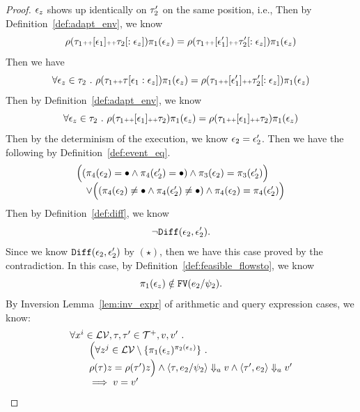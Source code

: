 \begin{proof}
$\mathtt{\epsilon}_z$ shows up identically on $\mathtt{\tau}_2'$ on the same position, i.e.,
Then by Definition~\ref{def:adapt_env}, we know 
\[
	\rho(\mathtt{\tau}_1 {\scriptscriptstyle ++} [\mathtt{\epsilon}_1] {\scriptscriptstyle ++} \mathtt{\tau}_2[:\mathtt{\epsilon}_z]) \pi_1(\mathtt{\epsilon}_z) = \rho(\mathtt{\tau}_1 {\scriptscriptstyle ++} [\mathtt{\epsilon}_1'] {\scriptscriptstyle ++} \mathtt{\tau}_2'[:\mathtt{\epsilon}_z]) \pi_1(\mathtt{\epsilon}_z)
\]
Then we have 
\[
	\forall \mathtt{\epsilon}_z \in \mathtt{\tau}_2 ~.~ 
	\rho(\mathtt{\tau}_1 {\scriptscriptstyle ++} \mathtt{\tau}[\mathtt{\epsilon}_1:\mathtt{\epsilon}_z]) \pi_1(\mathtt{\epsilon}_z) = \rho(\mathtt{\tau}_1 {\scriptscriptstyle ++} [\mathtt{\epsilon}_1'] {\scriptscriptstyle ++} \mathtt{\tau}_2'[:\mathtt{\epsilon}_z]) \pi_1(\mathtt{\epsilon}_z)
\]
Then by Definition~\ref{def:adapt_env}, we know 
\[
	\forall \mathtt{\epsilon}_z \in \mathtt{\tau}_2 ~.~ 
	\rho(\mathtt{\tau}_1 {\scriptscriptstyle ++} [\mathtt{\epsilon}_1] {\scriptscriptstyle ++} \mathtt{\tau}_2) \pi_1(\mathtt{\epsilon}_z) = \rho(\mathtt{\tau}_1 {\scriptscriptstyle ++} [\mathtt{\epsilon}_1] {\scriptscriptstyle ++} \mathtt{\tau}_2) \pi_1(\mathtt{\epsilon}_z)
\]
Then by the determinism of the execution, we know $\mathtt{\epsilon}_2 = \mathtt{\epsilon}_2'$.
Then we have the following by Definition~\ref{def:event_eq}.
\[
	\begin{array}{l}
	\Big( (\pi_4(\mathtt{\epsilon}_2) = \bullet \land \pi_4(\mathtt{\epsilon}_2') = \bullet) \land \pi_3(\mathtt{\epsilon}_2) = \pi_3(\mathtt{\epsilon}_2') \Big)
	\\ \quad \lor
	\Big( (\pi_4(\mathtt{\epsilon}_2) \neq \bullet \land \pi_4(\mathtt{\epsilon}_2') \neq \bullet) \land \pi_4(\mathtt{\epsilon}_2) = \pi_4(\mathtt{\epsilon}_2') \Big)
	\end{array}
	\]
Then by Definition~\ref{def:diff}, we know
\[
	\neg \mathtt{Diff}(\mathtt{\epsilon}_2, \mathtt{\epsilon}_2').
	\]
Since we know $\mathtt{Diff}(\mathtt{\epsilon}_2, \mathtt{\epsilon}_2')$ by $(\star)$, then we have this case proved by the contradiction.
%
In this case, by Definition~\ref{def:feasible_flowsto}, we know
\[
	\pi_1(\mathtt{\epsilon}_z) \notin \mathtt{FV}(e_2 / \psi_2).
	\]
By Inversion Lemma~\ref{lem:inv_expr}
 of arithmetic and query expression cases, we know:
%
\[
	\begin{array}{l}
		\forall x^i \in \mathcal{LV}, \mathtt{\tau}, \mathtt{\tau}' \in \mathcal{T}^{+}, v, v' ~.~ 
		\\ \qquad 
		\Big( \forall z^j \in \mathcal{LV} \setminus \{\pi_1(\mathtt{\epsilon}_z)^{\pi_2(\mathtt{\epsilon}_z)} \} ~.~  
		\\ \qquad 
		\rho(\mathtt{\tau}) z = \rho(\mathtt{\tau}') z \Big) \land 
	\langle \mathtt{\tau}, e_2 / \psi_2 \rangle \Downarrow_a v \land \langle \mathtt{\tau}', e_2 \rangle \Downarrow_a  v' \\ \qquad 
	\implies v = v'

\end{array}\]
\end{proof}
